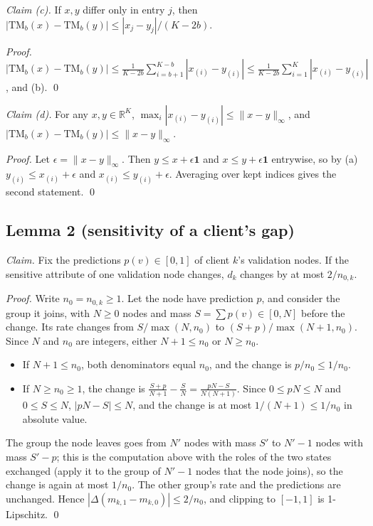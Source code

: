 \documentclass[11pt]{article}
\theoremstyle{plain}
\theoremstyle{definition}
\newcommand{\R}{\mathbb{R}}
\newcommand{\TM}{\mathrm{TM}_b}
\begin{document}
\emph{Claim (c).} If $x,y$ differ only in entry $j$, then $|\TM(x)-\TM(y)|\le|x_j-y_j|/(K-2b)$.

\emph{Proof.} $|\TM(x)-\TM(y)|\le\frac{1}{K-2b}\sum_{i=b+1}^{K-b}|x_{(i)}-y_{(i)}|\le\frac{1}{K-2b}\sum_{i=1}^{K}|x_{(i)}-y_{(i)}|$, and (b). \qed

\emph{Claim (d).} For any $x,y\in\R^K$, $\max_i|x_{(i)}-y_{(i)}|\le\|x-y\|_\infty$, and $|\TM(x)-\TM(y)|\le\|x-y\|_\infty$.

\emph{Proof.} Let $\epsilon=\|x-y\|_\infty$. Then $y\le x+\epsilon\mathbf 1$ and $x\le y+\epsilon\mathbf 1$ entrywise, so by (a) $y_{(i)}\le x_{(i)}+\epsilon$ and $x_{(i)}\le y_{(i)}+\epsilon$. Averaging over kept indices gives the second statement. \qed

\subsection*{Lemma 2 (sensitivity of a client's gap)}
\emph{Claim.} Fix the predictions $p(v)\in[0,1]$ of client $k$'s validation nodes. If the sensitive attribute of one validation node changes, $d_k$ changes by at most $2/n_{0,k}$.

\emph{Proof.} Write $n_0=n_{0,k}\ge1$. Let the node have prediction $p$, and consider the group it joins, with $N\ge0$ nodes and mass $S=\sum p(v)\in[0,N]$ before the change. Its rate changes from $S/\max(N,n_0)$ to $(S+p)/\max(N+1,n_0)$. Since $N$ and $n_0$ are integers, either $N+1\le n_0$ or $N\ge n_0$.
\begin{itemize}
\item If $N+1\le n_0$, both denominators equal $n_0$, and the change is $p/n_0\le1/n_0$.
\item If $N\ge n_0\ge1$, the change is $\frac{S+p}{N+1}-\frac{S}{N}=\frac{pN-S}{N(N+1)}$. Since $0\le pN\le N$ and $0\le S\le N$, $|pN-S|\le N$, and the change is at most $1/(N+1)\le1/n_0$ in absolute value.
\end{itemize}
The group the node leaves goes from $N'$ nodes with mass $S'$ to $N'-1$ nodes with mass $S'-p$; this is the computation above with the roles of the two states exchanged (apply it to the group of $N'-1$ nodes that the node joins), so the change is again at most $1/n_0$. The other group's rate and the predictions are unchanged. Hence $|\Delta(m_{k,1}-m_{k,0})|\le2/n_0$, and clipping to $[-1,1]$ is 1-Lipschitz. \qed
\end{document}
